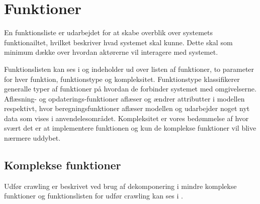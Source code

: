 \section{Funktioner}
\label{sec:funktioner}

En funktionsliste er udarbejdet for at skabe overblik over systemets funktionailtet, hvilket beskriver hvad systemet skal kunne. Dette skal som minimum dække over hvordan aktørerne vil interagere med systemet.

Funktionslisten kan ses i  og indeholder ud over listen af funktioner, to parameter for hver funktion, funktionstype og kompleksitet. Funktionstype klassifikerer generalle typer af funktioner på hvordan de forbinder systemet med omgivelserne. Aflæsning- og opdaterings-funktioner aflæser og ændrer attributter i modellen respektivt, hvor beregningsfunktioner aflæser modellen og udarbejder noget nyt data som vises i anvendelesområdet. Kompleksitet er vores bedømmelse af hvor svært det er at implementere funktionen og kun de komplekse funktioner vil blive nærmere uddybet.



\subsection{Komplekse funktioner}
Udfør crawling er beskrivet ved brug af dekomponering i mindre komplekse funktioner og funktionslisten for udfør crawling kan ses i .

